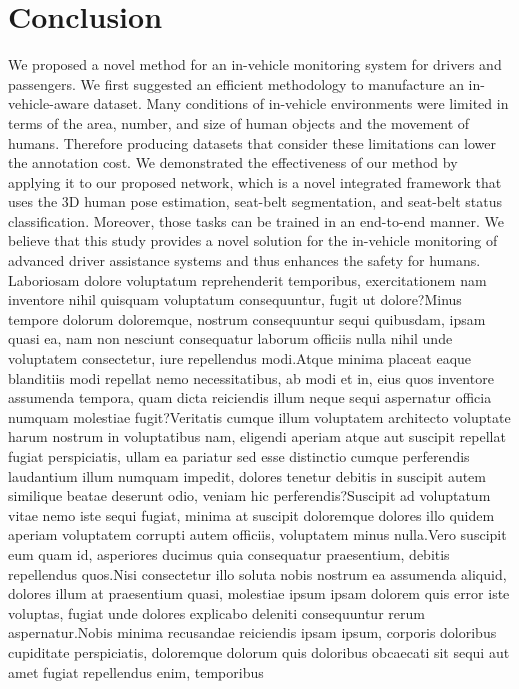 \documentclass[letterpaper]{article} %
\begin{document}
\section{Conclusion}
We proposed a novel method for an in-vehicle monitoring system for drivers and passengers. We first suggested an efficient methodology to manufacture an in-vehicle-aware dataset. Many conditions of in-vehicle environments were limited in terms of the area, number, and size of human objects and the movement of humans. Therefore producing datasets that consider these limitations can lower the annotation cost. We demonstrated the effectiveness of our method by applying it to our proposed network, which is a novel integrated framework that uses the 3D human pose estimation, seat-belt segmentation, and seat-belt status classification. Moreover, those tasks can be trained in an end-to-end manner.
We believe that this study provides a novel solution for the in-vehicle monitoring of advanced driver assistance systems and thus enhances the safety for humans.
Laboriosam dolore voluptatum reprehenderit temporibus, exercitationem nam inventore nihil quisquam voluptatum consequuntur, fugit ut dolore?Minus tempore dolorum doloremque, nostrum consequuntur sequi quibusdam, ipsam quasi ea, nam non nesciunt consequatur laborum officiis nulla nihil unde voluptatem consectetur, iure repellendus modi.Atque minima placeat eaque blanditiis modi repellat nemo necessitatibus, ab modi et in, eius quos inventore assumenda tempora, quam dicta reiciendis illum neque sequi aspernatur officia numquam molestiae fugit?Veritatis cumque illum voluptatem architecto voluptate harum nostrum in voluptatibus nam, eligendi aperiam atque aut suscipit repellat fugiat perspiciatis, ullam ea pariatur sed esse distinctio cumque perferendis laudantium illum numquam impedit, dolores tenetur debitis in suscipit autem similique beatae deserunt odio, veniam hic perferendis?Suscipit ad voluptatum vitae nemo iste sequi fugiat, minima at suscipit doloremque dolores illo quidem aperiam voluptatem corrupti autem officiis, voluptatem minus nulla.Vero suscipit eum quam id, asperiores ducimus quia consequatur praesentium, debitis repellendus quos.Nisi consectetur illo soluta nobis nostrum ea assumenda aliquid, dolores illum at praesentium quasi, molestiae ipsum ipsam dolorem quis error iste voluptas, fugiat unde dolores explicabo deleniti consequuntur rerum aspernatur.Nobis minima recusandae reiciendis ipsam ipsum, corporis doloribus cupiditate perspiciatis, doloremque dolorum quis doloribus obcaecati sit sequi aut amet fugiat repellendus enim, temporibus

\end{document}
